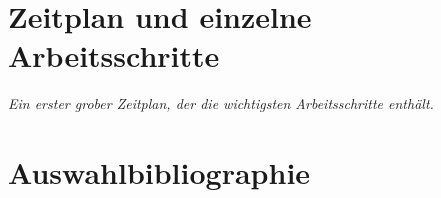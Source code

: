 \documentclass[11pt, titlepage=true]{scrartcl} %
\newcommand{\was}[1]{\small\textit{#1}}
\begin{document}
\section{Zeitplan und einzelne Arbeitsschritte}
\was{Ein erster grober Zeitplan, der die wichtigsten Arbeitsschritte enthält.}

\section{Auswahlbibliographie}
\cite{tukker_eight_2004}
\printbibliography
\end{document}
